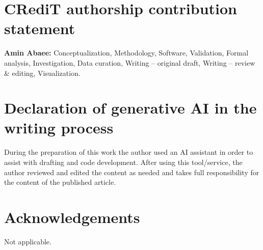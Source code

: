 \documentclass[3p,11pt]{elsarticle}
\begin{document}
\section*{CRediT authorship contribution statement}
\textbf{Amin Abaee:} Conceptualization, Methodology, Software, Validation,
Formal analysis, Investigation, Data curation, Writing -- original draft,
Writing -- review \& editing, Visualization.

\section*{Declaration of generative AI in the writing process}
During the preparation of this work the author used an AI assistant in
order to assist with drafting and code development. After using this
tool/service, the author reviewed and edited the content as needed and
takes full responsibility for the content of the published article.

\section*{Acknowledgements}
Not applicable.
\end{document}
